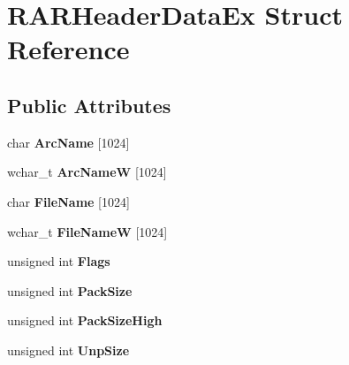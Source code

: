 \hypertarget{struct_r_a_r_header_data_ex}{\section{R\-A\-R\-Header\-Data\-Ex Struct Reference}
\label{struct_r_a_r_header_data_ex}
}
\subsection*{Public Attributes}
\begin{DoxyCompactItemize}
\item 
\hypertarget{struct_r_a_r_header_data_ex_a43c8bcbded6e2cc1ff023c1761e58607}{char {\bfseries Arc\-Name} \mbox{[}1024\mbox{]}}\label{struct_r_a_r_header_data_ex_a43c8bcbded6e2cc1ff023c1761e58607}

\item 
\hypertarget{struct_r_a_r_header_data_ex_a44a0229b81bfb918efc2b253dc912c20}{wchar\-\_\-t {\bfseries Arc\-Name\-W} \mbox{[}1024\mbox{]}}\label{struct_r_a_r_header_data_ex_a44a0229b81bfb918efc2b253dc912c20}

\item 
\hypertarget{struct_r_a_r_header_data_ex_ac3d87f01fb0a5a6f0b4b0c1d6902a600}{char {\bfseries File\-Name} \mbox{[}1024\mbox{]}}\label{struct_r_a_r_header_data_ex_ac3d87f01fb0a5a6f0b4b0c1d6902a600}

\item 
\hypertarget{struct_r_a_r_header_data_ex_a815c56ac0889b94e3df20fa04bfd341c}{wchar\-\_\-t {\bfseries File\-Name\-W} \mbox{[}1024\mbox{]}}\label{struct_r_a_r_header_data_ex_a815c56ac0889b94e3df20fa04bfd341c}

\item 
\hypertarget{struct_r_a_r_header_data_ex_a8a7b6bc77c9e2a55ddc6f7c85741d213}{unsigned int {\bfseries Flags}}\label{struct_r_a_r_header_data_ex_a8a7b6bc77c9e2a55ddc6f7c85741d213}

\item 
\hypertarget{struct_r_a_r_header_data_ex_a4e720351c4ecb9be4bcb6981476b4670}{unsigned int {\bfseries Pack\-Size}}\label{struct_r_a_r_header_data_ex_a4e720351c4ecb9be4bcb6981476b4670}

\item 
\hypertarget{struct_r_a_r_header_data_ex_a28015fb58ecf75937f851767ab9a6508}{unsigned int {\bfseries Pack\-Size\-High}}\label{struct_r_a_r_header_data_ex_a28015fb58ecf75937f851767ab9a6508}

\item 
\hypertarget{struct_r_a_r_header_data_ex_a03d44b5c45677e992f44a2b39b51cd76}{unsigned int {\bfseries Unp\-Size}}\label{struct_r_a_r_header_data_ex_a03d44b5c45677e992f44a2b39b51cd76}


\end{DoxyCompactItemize}
